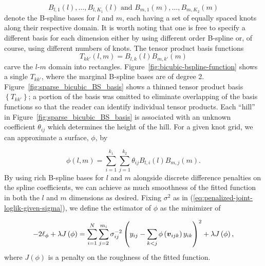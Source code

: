 \[
B_{l,1}\left(l\right),\dots, B_{l,K_1}\left(l\right)  \mbox{ and } B_{m,1}\left(m\right),\dots, B_{m,K_2}\left(m\right)
\]
\noindent
denote the B-spline bases for $l$ and $m$, each having a set of equally spaced knots along their respective domain. It is worth noting that one is free to specify a different basis for each dimension either by using different order B-spline or, of course, using different numbers of knots. The tensor product basis functions
\begin{equation*}
T_{kk'}\left(l,m\right) = B_{l,k}\left(l\right){B}_{m,k'}\left(m\right)
\end{equation*}
\noindent
carve the $l$-$m$ domain into rectangles. Figure~\ref{fig:bicubic-bspline-function} shows a single $T_{kk'}$, where the marginal B-spline bases are of degree 2. Figure~\ref{fig:sparse_bicubic_BS_basis} shows a thinned tensor product basis $\left\{ T_{kk'} \right\}$; a portion of the basis was omitted to eliminate overlapping of the basis functions so that the reader can identify individual tensor products. Each ``hill'' in Figure~\ref{fig:sparse_bicubic_BS_basis} is associated with an unknown coefficient $\theta_{ij}$ which determines the height of the hill. For a given knot grid, we can approximate a surface, $\phi$, by

\begin{equation} \label{eq:tensor-product-bspline-expansion-phi}
\phi\left(l,m\right) = \sum_{i=1}^{k_1} \sum_{j=1}^{k_2} \theta_{ij} B_{l,i}\left(l\right) B_{m,j}\left(m\right). 
\end{equation}
\noindent
 By using rich B-spline bases for $l$ and $m$ alongside discrete difference penalties on the spline coefficients, we can achieve as much smoothness of the fitted function in both the $l$ and $m$ dimensions as desired. Fixing $\sigma^2$ as in (\ref{eq:penalized-joint-loglik-given-sigma}), we define the estimator of $\phi$ as the minimizer of

\begin{equation} 
-2\ell_\phi + \lambda J\left(\phi\right) = \sum_{i=1}^N \sum_{j=2}^{m_i} \sigma^{-2}_{ij}\left( y_{ij} - \sum_{k<j} \phi\left(\mbox{\boldmath $v$}_{ijk}\right) y_{ik}  \right)^2 + \lambda J\left( \phi \right),
\end{equation} 
\noindent
where $J\left(\phi\right)$ is a penalty on the roughness of the fitted function. 


